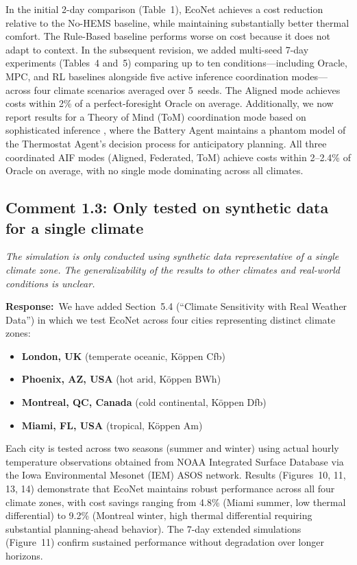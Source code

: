 \documentclass[11pt]{article}
\newcommand{\reviewercomment}[1]{\textit{#1}}
\newcommand{\response}{\textbf{Response:}\ }
\begin{document}
In the initial 2-day comparison (Table~1), EcoNet achieves a cost reduction relative to the No-HEMS baseline, while maintaining substantially better thermal comfort. The Rule-Based baseline performs worse on cost because it does not adapt to context. In the subsequent revision, we added multi-seed 7-day experiments (Tables~4 and~5) comparing up to ten conditions---including Oracle, MPC, and RL baselines alongside five active inference coordination modes---across four climate scenarios averaged over 5~seeds. The Aligned mode achieves costs within 2\% of a perfect-foresight Oracle on average. Additionally, we now report results for a Theory of Mind (ToM) coordination mode based on sophisticated inference \cite{pitliya2025theory}, where the Battery Agent maintains a phantom model of the Thermostat Agent's decision process for anticipatory planning. All three coordinated AIF modes (Aligned, Federated, ToM) achieve costs within 2--2.4\% of Oracle on average, with no single mode dominating across all climates.

\subsection*{Comment 1.3: Only tested on synthetic data for a single climate}

\reviewercomment{The simulation is only conducted using synthetic data representative of a single climate zone. The generalizability of the results to other climates and real-world conditions is unclear.}

\response We have added Section~5.4 (``Climate Sensitivity with Real Weather Data'') in which we test EcoNet across four cities representing distinct climate zones:

\begin{itemize}
    \item \textbf{London, UK} (temperate oceanic, K\"{o}ppen Cfb)
    \item \textbf{Phoenix, AZ, USA} (hot arid, K\"{o}ppen BWh)
    \item \textbf{Montreal, QC, Canada} (cold continental, K\"{o}ppen Dfb)
    \item \textbf{Miami, FL, USA} (tropical, K\"{o}ppen Am)
\end{itemize}

Each city is tested across two seasons (summer and winter) using actual hourly temperature observations obtained from NOAA Integrated Surface Database via the Iowa Environmental Mesonet (IEM) ASOS network. Results (Figures~10, 11, 13, 14) demonstrate that EcoNet maintains robust performance across all four climate zones, with cost savings ranging from 4.8\% (Miami summer, low thermal differential) to 9.2\% (Montreal winter, high thermal differential requiring substantial planning-ahead behavior). The 7-day extended simulations (Figure~11) confirm sustained performance without degradation over longer horizons.
\end{document}
